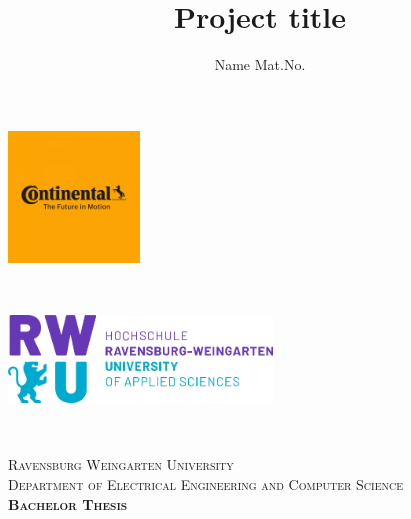 \documentclass[a4paper,11pt,singlespacing]{article}
\title{Project title}
\author{
	Name Mat.No.
	}
\begin{document}
\setlength{\parindent}{0ex}

\begin{titlepage}
	
	
	\begin{minipage}{0.4\textwidth}
		\begin{flushleft} \large
			\includegraphics[width=3.5cm]{./Images/conti_logo.png} %
		\end{flushleft}
	\end{minipage}
	~
	\begin{minipage}{0.5\textwidth}
		\begin{flushright} \large
			\includegraphics[width=7cm]{./Images/logo.png} %
		\end{flushright}
	\end{minipage}\\[2cm]
	
	
	\newcommand{\HRule}{\rule{\linewidth}{0.5mm}} %
	
	\center %
	
	
	\textsc{\LARGE Ravensburg Weingarten University}\\[1.5cm] %
	\textsc{\Large Department of
		Electrical Engineering
		and Computer Science}\\[0.5cm] %
	\textsc{\large  \textbf{Bachelor Thesis}}\\[0.5cm] %
	

\end{titlepage}
\end{document}
